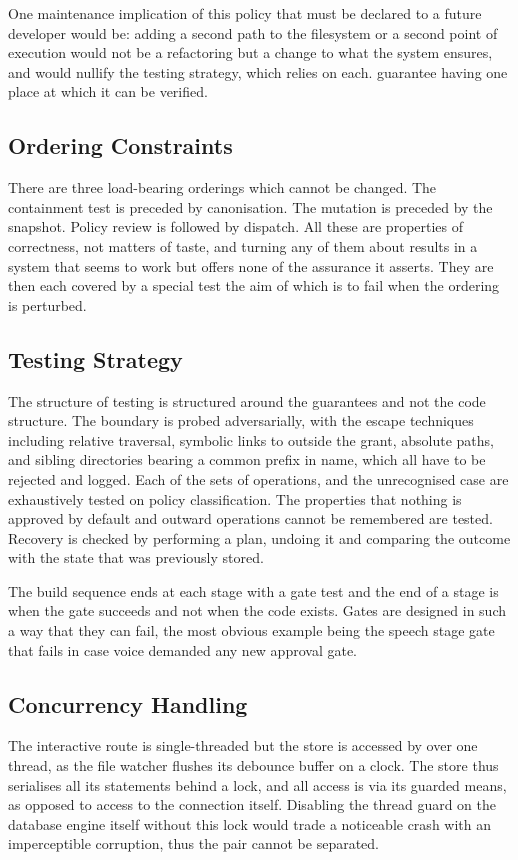 \documentclass{FastFyp}
\begin{document}
One maintenance implication of this policy that must be declared to a future developer would be: adding a second path to the filesystem or a second point of execution would not be a refactoring but a change to what the system ensures, and would nullify the testing strategy, which relies on each. guarantee having one place at which it can be verified.

\subsection{Ordering Constraints}
There are three load-bearing orderings which cannot be changed. The containment test is preceded by canonisation. The mutation is preceded by the snapshot. Policy review is followed by dispatch. All these are properties of correctness, not matters of taste, and turning any of them about results in a system that seems to work but offers none of the assurance it asserts. They are then each covered by a special test the aim of which is to fail when the ordering is perturbed.

\subsection{Testing Strategy}
The structure of testing is structured around the guarantees and not the code structure. The boundary is probed adversarially, with the escape techniques including relative traversal, symbolic links to outside the grant, absolute paths, and sibling directories bearing a common prefix in name, which all have to be rejected and logged. Each of the sets of operations, and the unrecognised case are exhaustively tested on policy classification. The properties that nothing is approved by default and outward operations cannot be remembered are tested. Recovery is checked by performing a plan, undoing it and comparing the outcome with the state that was previously stored.

The build sequence ends at each stage with a gate test and the end of a stage is when the gate succeeds and not when the code exists. Gates are designed in such a way that they can fail, the most obvious example being the speech stage gate that fails in case voice demanded any new approval gate.

\subsection{Concurrency Handling}
The interactive route is single-threaded but the store is accessed by over one thread, as the file watcher flushes its debounce buffer on a clock. The store thus serialises all its statements behind a lock, and all access is via its guarded means, as opposed to access to the connection itself. Disabling the thread guard on the database engine itself without this lock would trade a noticeable crash with an imperceptible corruption, thus the pair cannot be separated.
\end{document}
